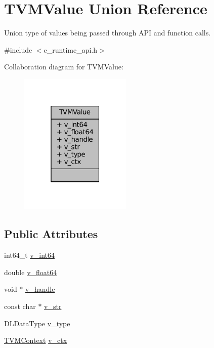 \hypertarget{unionTVMValue}{}\section{T\+V\+M\+Value Union Reference}
\label{unionTVMValue}


Union type of values being passed through A\+PI and function calls.  




{\ttfamily \#include $<$c\+\_\+runtime\+\_\+api.\+h$>$}



Collaboration diagram for T\+V\+M\+Value\+:
\nopagebreak
\begin{figure}[H]
\begin{center}
\leavevmode
\includegraphics[width=151pt]{unionTVMValue__coll__graph}
\end{center}
\end{figure}
\subsection*{Public Attributes}
\begin{DoxyCompactItemize}
\item 
int64\+\_\+t \hyperlink{unionTVMValue_aa1c40fa9e74fbf97541fd9735062c4cc}{v\+\_\+int64}
\item 
double \hyperlink{unionTVMValue_abefae93ebafe8818c0060df2bf31e6e5}{v\+\_\+float64}
\item 
void $\ast$ \hyperlink{unionTVMValue_a3b172297f9f7bf2f5391f7d87309cd44}{v\+\_\+handle}
\item 
const char $\ast$ \hyperlink{unionTVMValue_ab0e4dea6ca370fe7a7d22f4fc23a4f47}{v\+\_\+str}
\item 
D\+L\+Data\+Type \hyperlink{unionTVMValue_a75af73d1e39bc5de7073a008d44b0d16}{v\+\_\+type}
\item 
\hyperlink{c__runtime__api_8h_a9363bb701f16ce5bbb381f2a013d25b4}{T\+V\+M\+Context} \hyperlink{unionTVMValue_a93e4b1809f77d08e5fb68384cd4c9088}{v\+\_\+ctx}
\end{DoxyCompactItemize}


